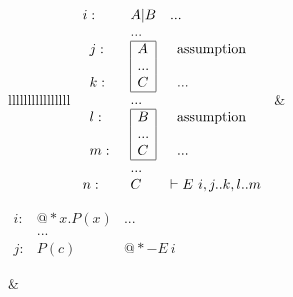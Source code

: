\documentclass[11pt]{book}
\begin{document}
\begin{tabular}{llllllllllllllll}
{$
\begin{array}{lll}
i: & A|B & ... \\
& ... &  \\
\begin{array}{l}
j: \\
\\
k:
\end{array}
& 
\begin{array}{|l|}
\hline
A \\
... \\
C \\
\hline
\end{array}
& 
\begin{array}{l}
\operatorname{assumption} \\
\\
...
\end{array}
\\
& ... &  \\
\begin{array}{l}
l: \\
\\
m:
\end{array}
& 
\begin{array}{|l|}
\hline
B \\
... \\
C \\
\hline
\end{array}
& 
\begin{array}{l}
\operatorname{assumption} \\
\\
...
\end{array}
\\
& ... &  \\
n: & C & |-E\ i,j..k,l..m
\end{array}
$
} & 
{\raggedright

$
\begin{array}{lll}
i: & @*x.P(x) & ... \\
& ... &  \\
j: & P(c) & @*-E\ i
\end{array}
$
} & 
{\raggedright

}
\end{tabular}
\end{document}
